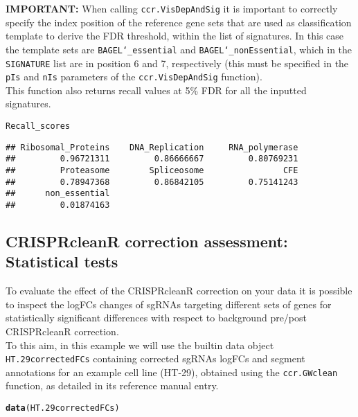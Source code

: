\documentclass{article}\usepackage[]{graphicx}\usepackage[]{color}
\makeatletter
\newcommand{\hlstd}[1]{\textcolor[rgb]{0.345,0.345,0.345}{#1}}%
\newcommand{\hlkwd}[1]{\textcolor[rgb]{0.737,0.353,0.396}{\textbf{#1}}}%
\newenvironment{kframe}{%
 \def\at@end@of@kframe{}%
 \ifinner\ifhmode%
  \def\at@end@of@kframe{\end{minipage}}%
  \begin{minipage}{\columnwidth}%
 \fi\fi%
 \def\FrameCommand##1{\hskip\@totalleftmargin \hskip-\fboxsep
 \colorbox{shadecolor}{##1}\hskip-\fboxsep
     \hskip-\linewidth \hskip-\@totalleftmargin \hskip\columnwidth}%
 \MakeFramed {\advance\hsize-\width
   \@totalleftmargin\z@ \linewidth\hsize
   \@setminipage}}%
 {\par\unskip\endMakeFramed%
 \at@end@of@kframe}
\newenvironment{knitrout}{}{} %
\makeatother
\begin{document}
\textbf{IMPORTANT:} When calling \texttt{ccr.VisDepAndSig} it is important to correctly specify the index position of the reference gene sets that are used as classification template to derive the FDR threshold, within the list of signatures. In this case the template sets are \texttt{BAGEL\char`_essential} and \texttt{BAGEL\char`_nonEssential}, which in the \texttt{SIGNATURE} list are in position 6 and 7, respectively (this must be specified in the \texttt{pIs} and \texttt{nIs} parameters of the \texttt{ccr.VisDepAndSig} function).\\

This function also returns recall values at 5\% FDR for all the inputted signatures.

\begin{knitrout}
\color{fgcolor}\begin{kframe}
\begin{alltt}
\hlstd{Recall_scores}
\end{alltt}
\begin{verbatim}
## Ribosomal_Proteins    DNA_Replication     RNA_polymerase 
##         0.96721311         0.86666667         0.80769231 
##         Proteasome        Spliceosome                CFE 
##         0.78947368         0.86842105         0.75141243 
##      non_essential 
##         0.01874163
\end{verbatim}
\end{kframe}
\end{knitrout}

\subsection{CRISPRcleanR correction assessment: Statistical tests}
To evaluate the effect of the CRISPRcleanR correction on your data it is possible to inspect the logFCs changes of sgRNAs targeting different sets of genes for statistically significant differences with respect to background pre/post CRISPRcleanR correction.\\

To this aim, in this example we will use the builtin data object\\ \texttt{HT.29correctedFCs} containing corrected sgRNAs logFCs and segment annotations for an example cell line (HT-29), obtained using the \texttt{ccr.GWclean} function, as detailed in its reference manual entry.

\begin{knitrout}
\color{fgcolor}\begin{kframe}
\begin{alltt}
\hlkwd{data}\hlstd{(HT.29correctedFCs)}
\end{alltt}
\end{kframe}
\end{knitrout}
\end{document}
